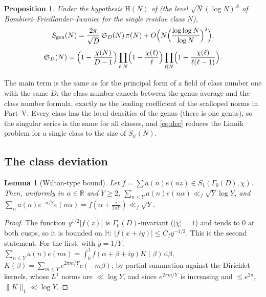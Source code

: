 \documentclass[11pt]{amsart}
\newtheorem{proposition}[theorem]{Proposition}
\newtheorem{lemma}[theorem]{Lemma}
\theoremstyle{remark}
\newcommand{\HH}{\mathbb H}
\newcommand{\sS}{\mathfrak S}
\newcommand{\dd}{\,\mathrm d}
\newcommand{\gen}{\mathrm{gen}}
\begin{document}
\begin{proposition}\label{prop:genus}
Under the hypothesis $\mathrm H(N)$ of \cite[Hypothesis~1.1]{ChenL} (the level $\sqrt N(\log N)^A$ of Bombieri--Friedlander--Iwaniec for the single residue class $N$),
\[
S_\gen(N)=\frac{2\pi}{\sqrt D}\,\sS_D(N)\,\pi(N)+O\Bigl(N\Bigl(\frac{\log\log N}{\log N}\Bigr)^2\Bigr),\]\[\sS_D(N)=\Bigl(1-\frac{\chi(N)}{D-1}\Bigr)\prod_{\ell\mid N}\Bigl(1-\frac{\chi(\ell)}\ell\Bigr)\prod_{\ell\nmid N}\Bigl(1+\frac{\chi(\ell)}{\ell(\ell-1)}\Bigr).
\]
\end{proposition}
The main term is the same as for the principal form of a field of class number one with the same $D$: the class number cancels between the genus average and the class number formula, exactly as the leading coefficient of the scalloped norms in Part~V. Every class has the local densities of the genus (there is one genus), so the singular series is the same for all classes, and \eqref{eq:dec} reduces the Linnik problem for a single class to the size of $S_\psi(N)$.

\subsection{The class deviation}
\begin{lemma}[Wilton-type bound]\label{lem:wilton}
Let $f=\sum a(n)e(nz)\in S_1(\Gamma_0(D),\chi)$. Then, uniformly in $\alpha\in\mathbb R$ and $Y\ge2$, $\sum_{n\le Y}a(n)e(n\alpha)\ll_f\sqrt Y\log Y$, and $\sum_na(n)e^{-n/Y}e(n\alpha)=f(\alpha+\frac i{2\pi Y})\ll_f\sqrt Y$.
\end{lemma}
\begin{proof}
The function $y^{1/2}|f(z)|$ is $\Gamma_0(D)$-invariant ($|\chi|=1$) and tends to $0$ at both cusps, so it is bounded on $\HH$: $|f(x+iy)|\le C_fy^{-1/2}$. This is the second statement. For the first, with $y=1/Y$, $\sum_{n\le Y}a(n)e(n\alpha)=\int_0^1f(\alpha+\beta+iy)K(\beta)\dd\beta$, $K(\beta)=\sum_{m\le Y}e^{2\pi m/Y}e(-m\beta)$; by partial summation against the Dirichlet kernels, whose $L^1$ norms are $\ll\log Y$, and since $e^{2\pi m/Y}$ is increasing and $\le e^{2\pi}$, $\|K\|_1\ll\log Y$.
\end{proof}
\end{document}
